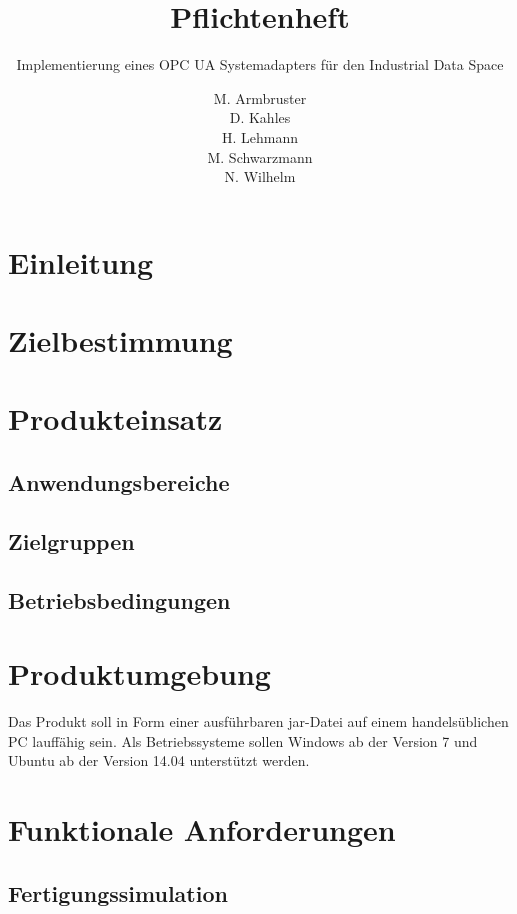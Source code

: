 \documentclass[parskip=full]{scrartcl}
\title{Pflichtenheft}
\subtitle{Implementierung eines OPC UA Systemadapters für den Industrial Data Space}
\author{
    M. Armbruster\\
    D. Kahles\\
    H. Lehmann\\
    M. Schwarzmann\\
    N. Wilhelm
}
\begin{document}
\maketitle
\tableofcontents
\pagebreak

\section{Einleitung}
\Blindtext[1]

\section{Zielbestimmung}
\Blindtext[1]

\section{Produkteinsatz}
\subsection{Anwendungsbereiche}
\Blindtext[1]

\subsection{Zielgruppen}
\Blindtext[1]

\subsection{Betriebsbedingungen}
\Blindtext[1]

\section{Produktumgebung}
Das Produkt soll in Form einer ausführbaren jar-Datei auf einem handelsüblichen PC lauffähig sein. Als Betriebssysteme sollen Windows ab der Version 7 und Ubuntu ab der Version 14.04 unterstützt werden.

\section{Funktionale Anforderungen}
\subsection{Fertigungssimulation}
\end{document}

